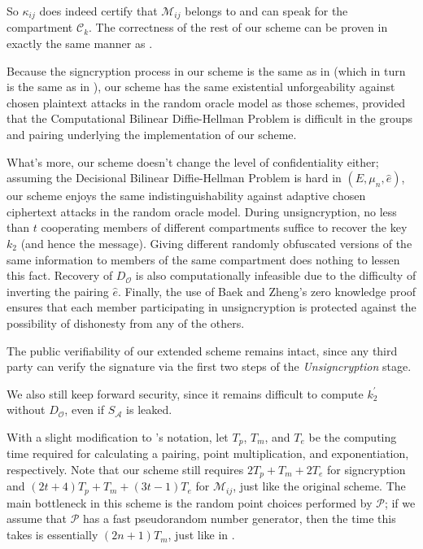 So $\kappa_{ij}$ does indeed certify that $\mathcal{M}_{ij}$ belongs to and can
    speak for the compartment $\mathcal{C}_k$.
The correctness of the rest of our scheme can be proven in exactly the same
    manner as \cite{li2006id}.



Because the signcryption process in our scheme is the same as in
    \cite{li2006id} (which in turn is the same as in \cite{chow2004efficient}),
    our scheme has the same existential unforgeability against chosen plaintext
    attacks in the random oracle model as those schemes, provided that the
    Computational Bilinear Diffie-Hellman Problem is difficult in the groups
    and pairing underlying the implementation of our scheme.

What's more, our scheme doesn't change the level of confidentiality either;
    assuming the Decisional Bilinear Diffie-Hellman Problem is hard in $(E,
    \mu_n, \widehat{e})$, our scheme enjoys the same indistinguishability
    against adaptive chosen ciphertext attacks in the random oracle model.
During unsigncryption, no less than $t$ cooperating members of different
    compartments suffice to recover the key $k_2$ (and hence the message).
Giving different randomly obfuscated versions of the same information to
    members of the same compartment does nothing to lessen this fact.
Recovery of $D_\mathcal{O}$ is also computationally infeasible due to the
    difficulty of inverting the pairing $\widehat{e}$.
Finally, the use of Baek and Zheng's zero knowledge proof ensures that each
    member participating in unsigncryption is protected against the possibility
    of dishonesty from any of the others.

The public verifiability of our extended scheme remains intact, since any third
    party can verify the signature via the first two steps of the
    \textit{Unsigncryption} stage.

We also still keep forward security, since it remains difficult to compute
    $k_2^\prime$ without $D_\mathcal{O}$, even if $S_\mathcal{A}$ is leaked.


With a slight modification to \cite{li2006id}'s notation, let $T_p$, $T_m$, and
    $T_e$ be the computing time required for calculating a pairing, point
    multiplication, and exponentiation, respectively.
Note that our scheme still requires $2T_p + T_m + 2T_e$ for signcryption and
    $(2t + 4)T_p + T_m + (3t - 1)T_e$ for $\mathcal{M}_{ij}$, just like the
    original scheme.
The main bottleneck in this scheme is the random point choices performed by
    $\mathcal{P}$; if we assume that $\mathcal{P}$ has a fast pseudorandom
    number generator, then the time this takes is essentially $(2n + 1)T_m$,
    just like in \cite{li2006id}.

